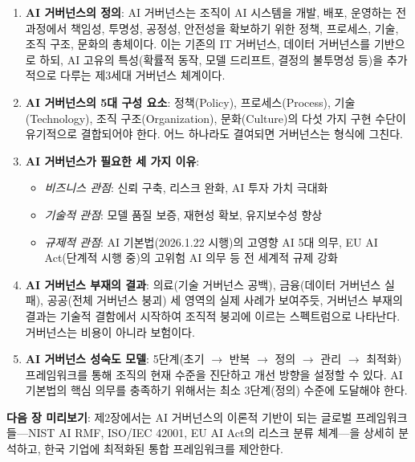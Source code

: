 \begin{enumerate}
    \item \textbf{AI 거버넌스의 정의}: AI 거버넌스는 조직이 AI 시스템을 개발, 배포, 운영하는 전 과정에서 책임성, 투명성, 공정성, 안전성을 확보하기 위한 정책, 프로세스, 기술, 조직 구조, 문화의 총체이다. 이는 기존의 IT 거버넌스, 데이터 거버넌스를 기반으로 하되, AI 고유의 특성(확률적 동작, 모델 드리프트, 결정의 불투명성 등)을 추가적으로 다루는 제3세대 거버넌스 체계이다.

    \item \textbf{AI 거버넌스의 5대 구성 요소}: 정책(Policy), 프로세스(Process), 기술(Technology), 조직 구조(Organization), 문화(Culture)의 다섯 가지 구현 수단이 유기적으로 결합되어야 한다. 어느 하나라도 결여되면 거버넌스는 형식에 그친다.

    \item \textbf{AI 거버넌스가 필요한 세 가지 이유}:
    \begin{itemize}
        \item \textit{비즈니스 관점}: 신뢰 구축, 리스크 완화, AI 투자 가치 극대화
        \item \textit{기술적 관점}: 모델 품질 보증, 재현성 확보, 유지보수성 향상
        \item \textit{규제적 관점}: AI 기본법(2026.1.22 시행)의 고영향 AI 5대 의무, EU AI Act(단계적 시행 중)의 고위험 AI 의무 등 전 세계적 규제 강화
    \end{itemize}

    \item \textbf{AI 거버넌스 부재의 결과}: 의료(기술 거버넌스 공백), 금융(데이터 거버넌스 실패), 공공(전체 거버넌스 붕괴) 세 영역의 실제 사례가 보여주듯, 거버넌스 부재의 결과는 기술적 결함에서 시작하여 조직적 붕괴에 이르는 스펙트럼으로 나타난다. 거버넌스는 비용이 아니라 보험이다.

    \item \textbf{AI 거버넌스 성숙도 모델}: 5단계(초기 $\rightarrow$ 반복 $\rightarrow$ 정의 $\rightarrow$ 관리 $\rightarrow$ 최적화) 프레임워크를 통해 조직의 현재 수준을 진단하고 개선 방향을 설정할 수 있다. AI 기본법의 핵심 의무를 충족하기 위해서는 최소 3단계(정의) 수준에 도달해야 한다.
\end{enumerate}

\vspace{0.5cm}
\noindent\textbf{다음 장 미리보기}: 제2장에서는 AI 거버넌스의 이론적 기반이 되는 글로벌 프레임워크들---NIST AI RMF, ISO/IEC 42001, EU AI Act의 리스크 분류 체계---을 상세히 분석하고, 한국 기업에 최적화된 통합 프레임워크를 제안한다.

